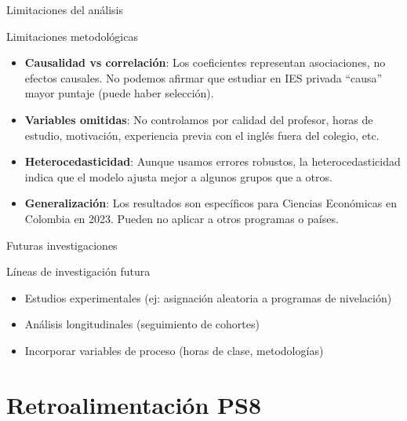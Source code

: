 \documentclass[aspectratio=169, 11pt]{beamer}
\begin{document}
\begin{frame}{Limitaciones del análisis}
\begin{block}{Limitaciones metodológicas}
\begin{itemize}\setlength{\itemsep}{2pt}
\item \textbf{Causalidad vs correlación}: Los coeficientes representan asociaciones, no efectos causales. No podemos afirmar que estudiar en IES privada ``causa'' mayor puntaje (puede haber selección).

\item \textbf{Variables omitidas}: No controlamos por calidad del profesor, horas de estudio, motivación, experiencia previa con el inglés fuera del colegio, etc.

\item \textbf{Heterocedasticidad}: Aunque usamos errores robustos, la heterocedasticidad indica que el modelo ajusta mejor a algunos grupos que a otros.

\item \textbf{Generalización}: Los resultados son específicos para Ciencias Econ\'omicas en Colombia en 2023. Pueden no aplicar a otros programas o países.
\end{itemize}
\end{block}
\end{frame}

\begin{frame}{Futuras investigaciones}
\begin{exampleblock}{Líneas de investigación futura}
\begin{itemize}
\item Estudios experimentales (ej: asignación aleatoria a programas de nivelación)
\item Análisis longitudinales (seguimiento de cohortes)
\item Incorporar variables de proceso (horas de clase, metodologías)
\end{itemize}
\end{exampleblock}
\end{frame}

\section{Retroalimentación PS8}
\end{document}
